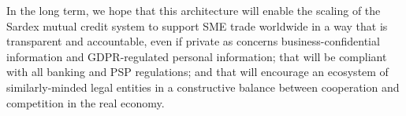 In the long term, we hope that this architecture will enable the scaling of the Sardex mutual credit system to support SME trade worldwide in a way that is transparent and accountable, even if private as concerns business-confidential information and GDPR-regulated personal information; that will be compliant with all banking and PSP regulations; and that will encourage an ecosystem of similarly-minded legal entities in a constructive balance between cooperation and competition in the real economy.



\newpage











